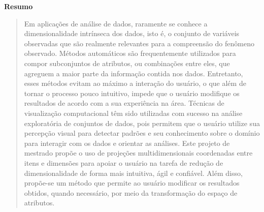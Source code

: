 \begin{center}
  \textbf{Resumo}
\end{center}

\begin{quotation}
\noindent
%
Em aplicações de análise de dados, raramente se conhece a dimensionalidade intrínseca dos dados, isto é, o conjunto de variáveis observadas que são realmente relevantes para a compreensão do fenômeno observado.
%
Métodos automáticos são frequentemente utilizados para compor subconjuntos de atributos, ou combinações entre eles, que agreguem a maior parte da informação contida nos dados. 
%
Entretanto, esses métodos evitam ao máximo a interação do usuário, o que além de tornar o processo pouco intuitivo, impede que o usuário modifique os resultados de acordo com a sua experiência na área. 
%
Técnicas de visualização computacional têm sido utilizadas com sucesso na análise exploratória de conjuntos de dados, pois permitem que o usuário utilize sua percepção visual para detectar padrões e seu conhecimento sobre o domínio para interagir com os dados e orientar as análises. 
%
Este projeto de mestrado propõe o uso de projeções multidimensionais coordenadas entre itens e dimensões para apoiar o usuário na tarefa de redução de dimensionalidade de forma mais intuitiva, ágil e confiável. Além disso, propõe-se um método que permite ao usuário modificar os resultados obtidos, quando necessário, por meio da transformação do espaço de atributos.
%
\end{quotation}

